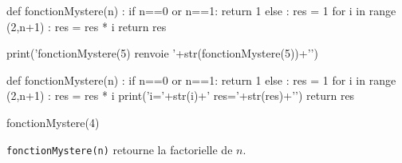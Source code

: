 \exer{}
\setcounter{numques}{0}

\begin{minipage}{0.5\textwidth}

\begin{pycode}
def fonctionMystere(n) :
    if n==0 or n==1:
         return 1
    else :
        res = 1
    for i in range (2,n+1) :
        res = res * i
    return res

print('fonctionMystere(5) renvoie '+str(fonctionMystere(5))+'\n')
\end{pycode}
\end{minipage}
\begin{minipage}{0.5\textwidth}

\begin{pycode}
def fonctionMystere(n) :
    if n==0 or n==1:
         return 1
    else :
        res = 1
    for i in range (2,n+1) :
        res = res * i
        print('i='+str(i)+' res='+str(res)+'\n')
    return res

fonctionMystere(4)
\end{pycode}
\end{minipage}





\texttt{fonctionMystere(n)} retourne la factorielle de $n$.
